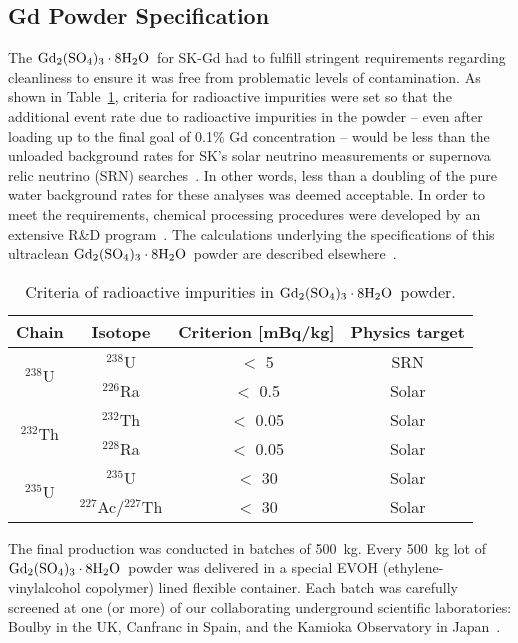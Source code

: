\documentclass[preprint,12pt]{elsarticle}
\newcommand{\GdSOw}{$\rm Gd_2(\rm SO_4)_3\cdot \rm 8H_2O$\ }
\begin{document}
\subsection{Gd Powder Specification}
\label{S:4-1}
The \GdSOw for SK-Gd had to fulfill stringent requirements regarding cleanliness to ensure it was free from problematic levels of contamination. 
As shown in Table~\ref{tab:RIinGd}, criteria for radioactive impurities were set so that the additional event rate due to radioactive impurities in the powder -- even after loading up to the final goal of 0.1\% Gd concentration -- would be less than the unloaded background rates for SK's solar neutrino measurements or supernova relic neutrino (SRN) searches~\cite{pablo:2017phD}.  In other words, less than a doubling of the pure water background rates for these analyses was deemed acceptable.
In order to meet the requirements, chemical processing procedures were developed by an extensive R\&D program~\cite{egads:2020,Ito:2020ptep}.
The calculations underlying the specifications of this ultraclean \GdSOw powder are described elsewhere~\cite{pablo:2017phD,Ito:2020ptep}.


\begin{table}[htb]
	\centering
	\caption{Criteria of radioactive impurities in \GdSOw powder.}
	\label{tab:RIinGd}
    \vspace*{0.1cm}
    \begin{tabular}{cccc}
	    \hline 
		Chain & Isotope & Criterion [mBq/kg] & Physics target \\
		\hline
		\hline
		\multirow{2}{*}{$^{238}$U}  & $^{238}$U  &  $<$ 5  & SRN  \\
 			                    	& $^{226}$Ra   & $<$ 0.5 & Solar \\
		\hline
		\multirow{2}{*}{$^{232}$Th} & $^{232}$Th   & $<$ 0.05 & Solar \\
			                     	& $^{228}$Ra   & $<$ 0.05 & Solar \\
		\hline
		\multirow{2}{*}{$^{235}$U} & $^{235}$U     & $<$ 30 & Solar \\
			                     	& $^{227}$Ac/$^{227}$Th & $<$ 30 & Solar \\
		\hline
	\end{tabular}
\end{table}



The final production was conducted in batches of 500~kg. Every 500~kg lot of \GdSOw powder was delivered in a special EVOH (ethylene-vinylalcohol copolymer) lined flexible container. Each batch was carefully screened at one (or more) of our collaborating underground scientific laboratories: Boulby in the UK, Canfranc in Spain, and the Kamioka Observatory in Japan~\cite{ikedaLRT}.  
\end{document}

